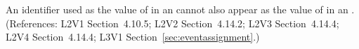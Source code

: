 An identifier used as the value of  in an \EventAssignment
cannot also appear as the value of  in an \AssignmentRule.
(References: L2V1 Section~4.10.5; L2V2 Section~4.14.2; L2V3 Section~4.14.4;
L2V4 Section~4.14.4; L3V1 Section~\ref{sec:eventassignment}.)
